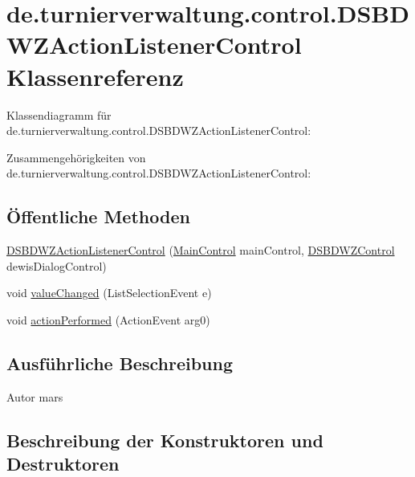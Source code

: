 \hypertarget{classde_1_1turnierverwaltung_1_1control_1_1_d_s_b_d_w_z_action_listener_control}{}\section{de.\+turnierverwaltung.\+control.\+D\+S\+B\+D\+W\+Z\+Action\+Listener\+Control Klassenreferenz}
\label{classde_1_1turnierverwaltung_1_1control_1_1_d_s_b_d_w_z_action_listener_control}


Klassendiagramm für de.\+turnierverwaltung.\+control.\+D\+S\+B\+D\+W\+Z\+Action\+Listener\+Control\+:


Zusammengehörigkeiten von de.\+turnierverwaltung.\+control.\+D\+S\+B\+D\+W\+Z\+Action\+Listener\+Control\+:
\subsection*{Öffentliche Methoden}
\begin{DoxyCompactItemize}
\item 
\hyperlink{classde_1_1turnierverwaltung_1_1control_1_1_d_s_b_d_w_z_action_listener_control_ab91a530cc10092a2cccac32f0ccdd4ac}{D\+S\+B\+D\+W\+Z\+Action\+Listener\+Control} (\hyperlink{classde_1_1turnierverwaltung_1_1control_1_1_main_control}{Main\+Control} main\+Control, \hyperlink{classde_1_1turnierverwaltung_1_1control_1_1_d_s_b_d_w_z_control}{D\+S\+B\+D\+W\+Z\+Control} dewis\+Dialog\+Control)
\item 
void \hyperlink{classde_1_1turnierverwaltung_1_1control_1_1_d_s_b_d_w_z_action_listener_control_a16d85d755bf41b36eec2fb0702f9159b}{value\+Changed} (List\+Selection\+Event e)
\item 
void \hyperlink{classde_1_1turnierverwaltung_1_1control_1_1_d_s_b_d_w_z_action_listener_control_a24a5dd3b51b377f6b9f46aada378082d}{action\+Performed} (Action\+Event arg0)
\end{DoxyCompactItemize}


\subsection{Ausführliche Beschreibung}
\begin{DoxyAuthor}{Autor}
mars 
\end{DoxyAuthor}


\subsection{Beschreibung der Konstruktoren und Destruktoren}
